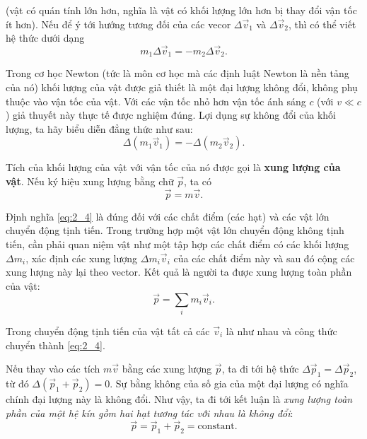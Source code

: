 \noindent
(vật có quán tính lớn hơn, nghĩa là vật có khối lượng lớn hơn bị thay đổi vận tốc ít hơn). Nếu để ý tới hướng tương đối của các vecor $\Delta\vec{v}_1$ và $\Delta\vec{v}_2$, thì có thể viết hệ thức  dưới dạng
\begin{equation}\label{eq:2_2}
m_1 \Delta\vec{v}_1 = - m_2 \Delta\vec{v}_2.
\end{equation}

Trong cơ học Newton (tức là môn cơ học mà các định luật Newton là nền tảng của nó) khối lượng của vật được giả thiết là một đại lượng không đổi, không phụ thuộc vào vận tốc của vật. Với các vận tốc nhỏ hơn vận tốc ánh sáng $c$ (với $v\ll c$) giả thuyết này thực tế được nghiệm đúng. Lợi dụng sự không đổi của khối lượng, ta hãy biểu diễn đẳng thức  như sau:
\begin{equation}\label{eq:2_3}
\Delta(m_1 \vec{v}_1) = - \Delta(m_2 \vec{v}_2).
\end{equation}

Tích của khối lượng của vật với vận tốc của nó được gọi là \textbf{xung lượng của vật}. Nếu ký hiệu xung lượng bằng chữ $\vec{p}$, ta có
\begin{equation}\label{eq:2_4}
\vec{p} = m \vec{v}.
\end{equation}

\noindent
Định nghĩa \eqref{eq:2_4} là đúng đối với các chất điểm (các hạt) và các vật lớn chuyển động tịnh tiến. Trong trường hợp một vật lớn chuyển động không tịnh tiến, cần phải quan niệm vật như một tập hợp các chất điểm có các khối lượng $\Delta m_i$, xác định các xung lượng $\Delta m_i\vec{v}_i$ của các chất điểm này và sau đó cộng các xung lượng này lại theo vector. Kết quả là người ta được xung lượng toàn phần của vật:
\begin{equation}\label{eq:2_5}
\vec{p} = \sum_{i} m_i \vec{v}_i.
\end{equation}

\noindent
Trong chuyển động tịnh tiến của vật tất cả các $\vec{v}_i$ là như nhau và công thức  chuyển thành \eqref{eq:2_4}.

Nếu thay vào  các tích $m\vec{v}$ bằng các xung lượng $\vec{p}$, ta đi tới hệ thức $\Delta\vec{p}_1=\Delta\vec{p}_2$, từ đó $\Delta(\vec{p}_1+\vec{p}_2)=0$. Sự bằng không của số gia của một đại lượng có nghĩa chính đại lượng này là không đổi. Như vậy, ta đi tới kết luận là \textit{xung lượng toàn phần của một hệ kín gồm hai hạt tương tác với nhau là không đổi}:
\begin{equation}\label{eq:2_6}
\vec{p} = \vec{p}_1 + \vec{p}_2 = \text{constant}.
\end{equation}


